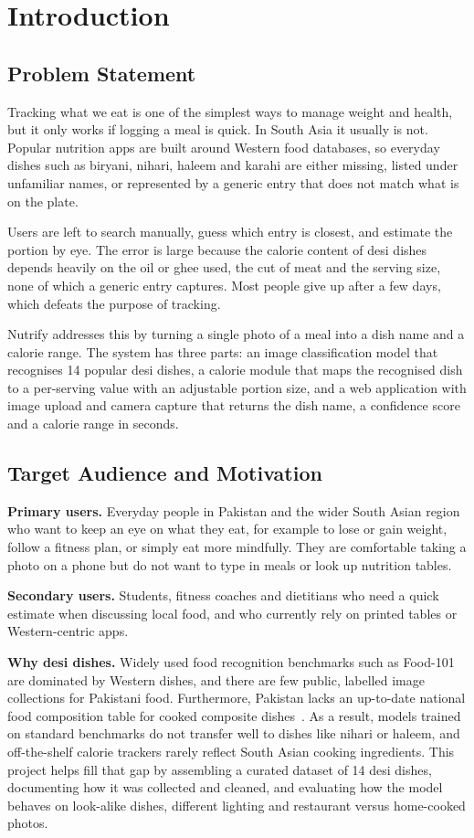 \section{Introduction}

\subsection{Problem Statement}
Tracking what we eat is one of the simplest ways to manage weight and health,
but it only works if logging a meal is quick. In South Asia it usually is not.
Popular nutrition apps are built around Western food databases, so everyday
dishes such as biryani, nihari, haleem and karahi are either missing, listed
under unfamiliar names, or represented by a generic entry that does not match
what is on the plate.

Users are left to search manually, guess which entry is closest, and estimate
the portion by eye. The error is large because the calorie content of desi
dishes depends heavily on the oil or ghee used, the cut of meat and the serving
size, none of which a generic entry captures. Most people give up after a few
days, which defeats the purpose of tracking.

Nutrify addresses this by turning a single photo of a meal into a dish name
and a calorie range. The system has three parts: an image classification model
that recognises 14 popular desi dishes, a calorie module that maps the
recognised dish to a per-serving value with an adjustable portion size, and a
web application with image upload and camera capture that returns the dish
name, a confidence score and a calorie range in seconds.

\subsection{Target Audience and Motivation}
\textbf{Primary users.} Everyday people in Pakistan and the wider South Asian
region who want to keep an eye on what they eat, for example to lose or gain
weight, follow a fitness plan, or simply eat more mindfully. They are
comfortable taking a photo on a phone but do not want to type in meals or
look up nutrition tables.

\textbf{Secondary users.} Students, fitness coaches and dietitians who need a
quick estimate when discussing local food, and who currently rely on printed
tables or Western-centric apps.

\textbf{Why desi dishes.} Widely used food recognition benchmarks such as
Food-101~\cite{bossard2014food101} are dominated by Western dishes, and there
are few public, labelled image collections for Pakistani food. Furthermore,
Pakistan lacks an up-to-date national food composition table for cooked
composite dishes~\cite{soomro2024matiari}. As a result, models trained on
standard benchmarks do not transfer well to dishes like nihari or haleem, and
off-the-shelf calorie trackers rarely reflect South Asian cooking ingredients.
This project helps fill that gap by assembling a curated dataset of 14 desi
dishes, documenting how it was collected and cleaned, and evaluating how the
model behaves on look-alike dishes, different lighting and restaurant versus
home-cooked photos.

